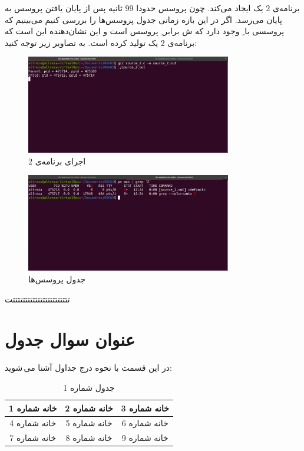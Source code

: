 \documentclass{article}
\begin{document}
برنامه‌ی 2 یک  ایجاد می‌کند. چون پروسس  حدودا 99 ثانیه پس از پایان یافتن پروسس  به پایان می‌رسد. اگر در این بازه زمانی جدول پروسس‌ها را بررسی کنیم می‌بینیم که پروسسی با ِ  وجود دارد که ش برابر ِ پروسس  است و این نشان‌دهنده این است که برنامه‌ی 2 یک  تولید کرده است. به تصاویر زیر توجه کنید:
\begin{figure}[H]
    \centering
    \includegraphics[width=0.8\textwidth]{figures/5.2.2.1.png}
    \caption{اجرای برنامه‌ی 2}
    \label{fig:fig1}
\end{figure}

\begin{figure}[H]
    \centering
    \includegraphics[width=0.8\textwidth]{figures/5.2.2.2.png}
    \caption{جدول پروسس‌ها}
    \label{fig:fig1}
\end{figure}
تتتتتتتتتتتتتتتتتتتتتتتت

\section{عنوان سوال جدول}
در این قسمت با نحوه درج جداول آشنا می\,شوید:
\begin{table}[ht]
    \centering
    \begin{tabular}{|c|c|c|}
    \hline
    خانه شماره 1 & خانه شماره 2 & خانه شماره 3\\
    \hline
    خانه شماره 4 & خانه شماره 5 & خانه شماره 6\\
    \hline
    خانه شماره 7 & خانه شماره 8 & خانه شماره 9\\
    \hline
    \end{tabular}
    \caption{جدول شماره 1}
    \label{tab:tab1}
\end{table}
\end{document}
